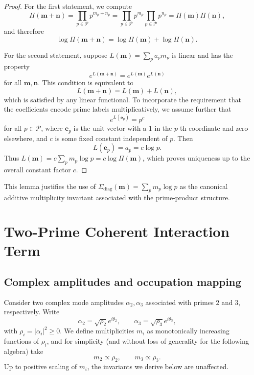 \documentclass[11pt]{article}
\begin{document}
\begin{proof}
For the first statement, we compute
\[
\Pi(\mathbf{m} + \mathbf{n}) = \prod_{p\in\mathcal{P}} p^{m_p + n_p}
= \prod_{p\in\mathcal{P}} p^{m_p} \prod_{p\in\mathcal{P}} p^{n_p}
= \Pi(\mathbf{m})\Pi(\mathbf{n}),
\]
and therefore
\[
\log\Pi(\mathbf{m} + \mathbf{n}) = \log\Pi(\mathbf{m}) + \log\Pi(\mathbf{n}).
\]

For the second statement, suppose \(L(\mathbf{m}) = \sum_p a_p m_p\) is linear and has the property
\[
e^{L(\mathbf{m}+\mathbf{n})} = e^{L(\mathbf{m})} e^{L(\mathbf{n})}
\]
for all \(\mathbf{m},\mathbf{n}\). This condition is equivalent to
\[
L(\mathbf{m}+\mathbf{n}) = L(\mathbf{m}) + L(\mathbf{n}),
\]
which is satisfied by any linear functional. To incorporate the requirement that the coefficients encode prime labels multiplicatively, we assume further that
\[
e^{L(\mathbf{e}_p)} = p^{c}
\]
for all \(p\in\mathcal{P}\), where \(\mathbf{e}_p\) is the unit vector with a 1 in the \(p\)-th coordinate and zero elsewhere, and \(c\) is some fixed constant independent of \(p\). Then
\[
L(\mathbf{e}_p) = a_p = c\log p.
\]
Thus \(L(\mathbf{m}) = c \sum_{p} m_p \log p = c\log\Pi(\mathbf{m})\), which proves uniqueness up to the overall constant factor \(c\).
\end{proof}

This lemma justifies the use of \(\Sigma_{\mathrm{diag}}(\mathbf{m}) = \sum_p m_p \log p\) as the canonical additive multiplicity invariant associated with the prime-product structure.

\section{Two-Prime Coherent Interaction Term}

\subsection{Complex amplitudes and occupation mapping}

Consider two complex mode amplitudes \(\alpha_2,\alpha_3\) associated with primes \(2\) and \(3\), respectively. Write
\[
\alpha_2 = \sqrt{\rho_2} e^{i\theta_2}, \qquad \alpha_3 = \sqrt{\rho_3} e^{i\theta_3},
\]
with \(\rho_i = |\alpha_i|^2 \ge 0\). We define multiplicities \(m_i\) as monotonically increasing functions of \(\rho_i\), and for simplicity (and without loss of generality for the following algebra) take
\[
m_2 \propto \rho_2,\qquad m_3 \propto \rho_3.
\]
Up to positive scaling of \(m_i\), the invariants we derive below are unaffected.
\end{document}
